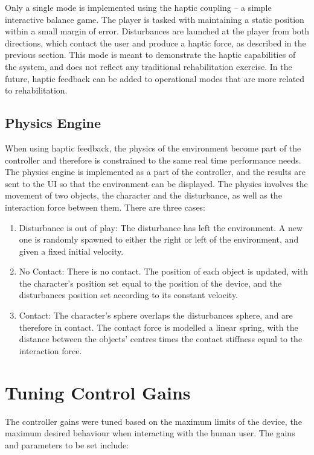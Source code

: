 \documentclass[12pt]{report}
\begin{document}
Only a single mode is implemented using the haptic coupling -- a simple interactive balance game. The player is tasked with maintaining a static position within a small margin of error. Disturbances are launched at the player from both directions, which contact the user and produce a haptic force, as described in the previous section. This mode is meant to demonstrate the haptic capabilities of the system, and does not reflect any traditional rehabilitation exercise. In the future, haptic feedback can be added to operational modes that are more related to rehabilitation. 

\subsection{Physics Engine} \label{sec:physics} 
	
When using haptic feedback, the physics of the environment become part of the controller and therefore is constrained to the same real time performance needs. The physics engine is implemented as a part of the controller, and the results are sent to the UI so that the environment can be displayed. The physics involves the movement of two objects, the character and the disturbance, as well as the interaction force between them. There are three cases:

\begin{enumerate}
	\item Disturbance is out of play: The disturbance has left the environment. A new one is randomly spawned to either the right or left of the environment, and given a fixed initial velocity.
	\item No Contact: There is no contact. The position of each object is updated, with the character's position set equal to the position of the device, and the disturbances position set according to its constant velocity. 
	\item Contact: The character's sphere overlaps the disturbances sphere, and are therefore in contact. The contact force is modelled a linear spring, with the distance between the objects' centres times the contact stiffness equal to the interaction force. 
\end{enumerate}

	
	\section{Tuning Control Gains}

	The controller gains were tuned based on the maximum limits of the  device, the maximum desired behaviour when interacting with the human user. The gains and parameters to be set include:
	
\end{document}
